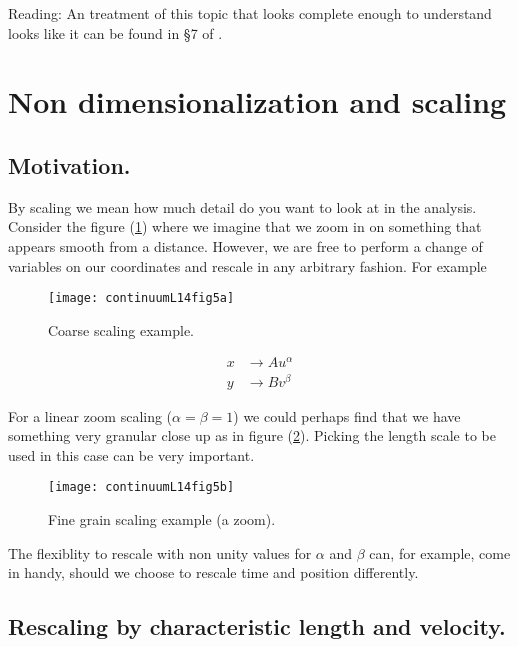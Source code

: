 Reading: An treatment of this topic that looks complete enough to understand looks like it can be found in \S 7 of \cite{landau1987course}.

\section{Non dimensionalization and scaling}

\subsection{Motivation.}

By scaling we mean how much detail do you want to look at in the analysis.  Consider the figure (\ref{fig:continuumL14:continuumL14fig5a}) where we imagine that we zoom in on something that appears smooth from a distance.  However, we are free to perform a change of variables on our coordinates and rescale in any arbitrary fashion.  For example

\begin{figure}[htp]
   \centering
   \texttt{[image: continuumL14fig5a]}
   \caption{Coarse scaling example.}\label{fig:continuumL14:continuumL14fig5a}
\end{figure}

\begin{align}\label{eqn:continuumL14:210}
x &\rightarrow A u^\alpha \\
y &\rightarrow B v^\beta
\end{align}

For a linear zoom scaling ($\alpha = \beta = 1$) we could perhaps find that we have something very granular close up as in figure (\ref{fig:continuumL14:continuumL14fig5b}).  Picking the length scale to be used in this case can be very important.

\begin{figure}[htp]
   \centering
   \texttt{[image: continuumL14fig5b]}
   \caption{Fine grain scaling example (a zoom).}\label{fig:continuumL14:continuumL14fig5b}
\end{figure}

The flexiblity to rescale with non unity values for $\alpha$ and $\beta$ can, for example, come in handy, should we choose to rescale time and position differently.

\subsection{Rescaling by characteristic length and velocity.}

